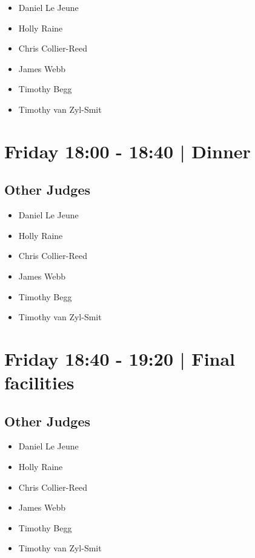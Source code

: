 \documentclass[10pt, A5]{article}
\begin{document}
            \begin{itemize}
                            \item Daniel Le Jeune
                            \item Holly Raine
                            \item Chris Collier-Reed
                            \item James Webb
                            \item Timothy Begg
                            \item Timothy van Zyl-Smit
                        \end{itemize}
        

            \section*{Friday 18:00
        -
        18:40
        |
         Dinner }
        
                
        \subsection*{Other Judges}
        
            \begin{itemize}
                            \item Daniel Le Jeune
                            \item Holly Raine
                            \item Chris Collier-Reed
                            \item James Webb
                            \item Timothy Begg
                            \item Timothy van Zyl-Smit
                        \end{itemize}
        

            \section*{Friday 18:40
        -
        19:20
        |
         Final facilities}
        
                
        \subsection*{Other Judges}
        
            \begin{itemize}
                            \item Daniel Le Jeune
                            \item Holly Raine
                            \item Chris Collier-Reed
                            \item James Webb
                            \item Timothy Begg
                            \item Timothy van Zyl-Smit
                        \end{itemize}
        
\end{document}
